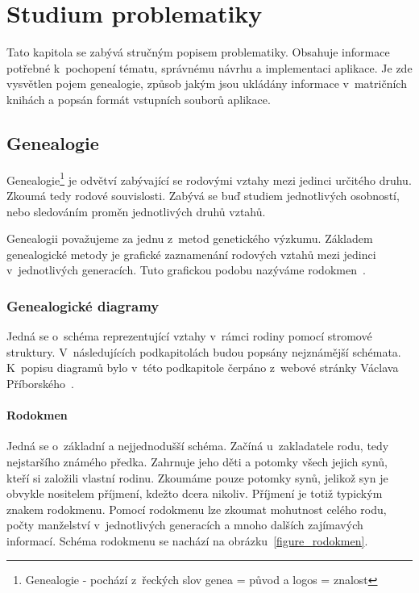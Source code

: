 \chapter{Studium problematiky}
\label{studium}
Tato kapitola se zabývá stručným popisem problematiky. Obsahuje informace potřebné k~pochopení tématu, správnému návrhu a implementaci aplikace. Je zde vysvětlen pojem genealogie, způsob jakým jsou ukládány informace v~matričních knihách a popsán formát vstupních souborů aplikace.
\section{Genealogie}
Genealogie\footnote{Genealogie - pochází z~řeckých slov genea = původ a logos = znalost} je odvětví zabývající se rodovými vztahy mezi jedinci určitého druhu. Zkoumá tedy rodové souvislosti. Zabývá se buď studiem jednotlivých osobností, nebo sledováním proměn jednotlivých druhů vztahů.

Genealogii považujeme za jednu z~metod genetického výzkumu. Základem genealogické metody je grafické zaznamenání rodových vztahů mezi jedinci v~jednotlivých generacích. Tuto grafickou podobu nazýváme rodokmen~\cite{genealogie}. 

\subsection{Genealogické diagramy}
Jedná se o~schéma reprezentující vztahy v~rámci rodiny pomocí stromové struktury. V~následujících podkapitolách budou popsány nejznámější schémata. K~popisu diagramů bylo v~této podkapitole čerpáno z~webové stránky Václava Příborského~\cite{geneDiagramy}.
\subsubsection{Rodokmen}
Jedná se o~základní a nejjednodušší schéma. Začíná u~zakladatele rodu, tedy nejstaršího známého předka. Zahrnuje jeho děti a potomky všech jejich synů, kteří si založili vlastní rodinu. Zkoumáme pouze potomky synů, jelikož syn je obvykle nositelem příjmení, kdežto dcera nikoliv. Příjmení je totiž typickým znakem rodokmenu. Pomocí rodokmenu lze zkoumat mohutnost celého rodu, počty manželství v~jednotlivých generacích a mnoho dalších zajímavých informací. Schéma rodokmenu se nachází na obrázku~\ref{figure_rodokmen}.

